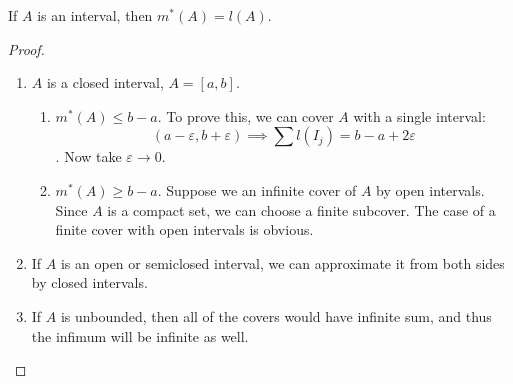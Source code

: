 \begin{proposition}
    If $A$ is an interval, then $m^*(A) = l(A)$.
\end{proposition}
\begin{proof}
    \begin{enumerate}[label=\alph*)]
        \item {
            $A$ is a closed interval, $A = [a, b]$.
            \begin{enumerate}[label=\arabic*.]
                \item {
                    $m^*(A) \le b - a$.
                    To prove this, we can cover $A$ with a single interval:
                    \[ (a - \varepsilon, b + \varepsilon) \implies \sum l(I_j) = b - a + 2\varepsilon \].
                    Now take $\varepsilon \to 0$.
                }
                \item {
                    $m^*(A) \ge b - a$.
                    Suppose we an infinite cover of $A$ by open intervals.
                    Since $A$ is a compact set, we can choose a finite subcover.
                    The case of a finite cover with open intervals is obvious.
                }
            \end{enumerate}
        }
        \item {
            If $A$ is an open or semiclosed interval, we can approximate it from both sides
            by closed intervals.
        }
        \item {
            If $A$ is unbounded, then all of the covers would have infinite sum, and thus 
            the infimum will be infinite as well.
        }
    \end{enumerate}
\end{proof}